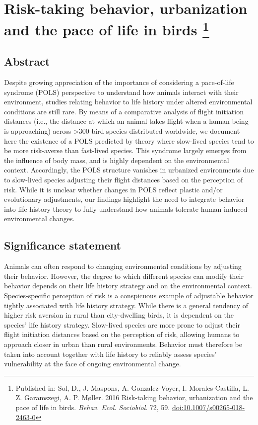 \chapter[Risk-taking behavior, urbanization and POLS]{Risk-taking behavior,
urbanization and the pace of life in birds
  \footnote{Published in: Sol, D., J. Maspons, A. Gonzalez-Voyer, I. Morales-Castilla, L. Z.
  Garamszegi, A. P. M\o{}ller. 2016 Risk-taking behavior, urbanization and the
  pace of life in birds. \textit{Behav. Ecol. Sociobiol}. 72, 59.
  \href{http://dx.doi.org/10.1007/s00265-018-2463-0}{doi:10.1007/s00265-018-2463-0}
  }
}\label{ch:POLS}


\section*{Abstract}

Despite growing appreciation of the importance of considering a pace-of-life syndrome (POLS) perspective to understand how
animals interact with their environment, studies relating behavior to life history under altered environmental conditions are still
rare. By means of a comparative analysis of flight initiation distances (i.e., the distance at which an animal takes flight when a
human being is approaching) across \textgreater{300} bird species distributed worldwide, we document here the existence of a POLS
predicted by theory where slow-lived species tend to be more risk-averse than fast-lived species. This syndrome largely emerges
from the influence of body mass, and is highly dependent on the environmental context. Accordingly, the POLS structure
vanishes in urbanized environments due to slow-lived species adjusting their flight distances based on the perception of risk.
While it is unclear whether changes in POLS reflect plastic and/or evolutionary adjustments, our findings highlight the need to
integrate behavior into life history theory to fully understand how animals tolerate human-induced environmental changes.


\section*{Significance statement}

Animals can often respond to changing environmental conditions by adjusting their behavior. However, the degree to which
different species can modify their behavior depends on their life history strategy and on the environmental context. 
Species-specific perception of risk is a conspicuous example of adjustable behavior tightly associated with life history strategy. While
there is a general tendency of higher risk aversion in rural than city-dwelling birds, it is dependent on the species’ life history
strategy. Slow-lived species are more prone to adjust their flight initiation distances based on the perception of risk, allowing
humans to approach closer in urban than rural environments. Behavior must therefore be taken into account together with life
history to reliably assess species’ vulnerability at the face of ongoing environmental change.

